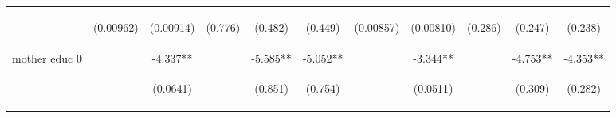 \documentclass{article}[11pt,subeqn]
\begin{document}
\begin{spacing}{1.5}
\begin{sidewaystable}[!htbp]
\begin{center}
\begin{tabular}{lcccccccccc}
\vspace{4pt} & \begin{footnotesize}		(0.00962)	\end{footnotesize} & \begin{footnotesize}	(0.00914)	\end{footnotesize} & \begin{footnotesize}	(0.776)	\end{footnotesize} & \begin{footnotesize}	(0.482)	\end{footnotesize} & \begin{footnotesize}	(0.449)	\end{footnotesize} & \begin{footnotesize}	(0.00857)	\end{footnotesize} & \begin{footnotesize}	(0.00810)	\end{footnotesize} & \begin{footnotesize}	(0.286)	\end{footnotesize} & \begin{footnotesize}	(0.247)	\end{footnotesize} & \begin{footnotesize}	(0.238)	\end{footnotesize} \\
mother educ 0	&		&	-4.337**	&		&	-5.585**	&	-5.052**	&		&	-3.344**	&		&	-4.753**	&	-4.353**	\\
\vspace{4pt} & \begin{footnotesize}			\end{footnotesize} & \begin{footnotesize}	(0.0641)	\end{footnotesize} & \begin{footnotesize}		\end{footnotesize} & \begin{footnotesize}	(0.851)	\end{footnotesize} & \begin{footnotesize}	(0.754)	\end{footnotesize} & \begin{footnotesize}		\end{footnotesize} & \begin{footnotesize}	(0.0511)	\end{footnotesize} & \begin{footnotesize}		\end{footnotesize} & \begin{footnotesize}	(0.309)	\end{footnotesize} & \begin{footnotesize}	(0.282)	\end{footnotesize} \\

\end{tabular}
\end{center}
\end{sidewaystable}
\end{spacing}
\end{document}

